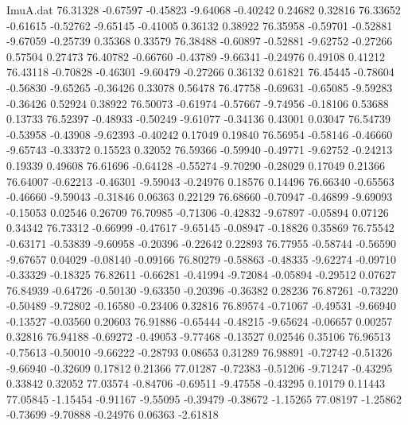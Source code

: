 \begin{filecontents}{ImuA.dat}
  76.31328   -0.67597   -0.45823   -9.64068   -0.40242    0.24682    0.32816
  76.33652   -0.61615   -0.52762   -9.65145   -0.41005    0.36132    0.38922
  76.35958   -0.59701   -0.52881   -9.67059   -0.25739    0.35368    0.33579
  76.38488   -0.60897   -0.52881   -9.62752   -0.27266    0.57504    0.27473
  76.40782   -0.66760   -0.43789   -9.66341   -0.24976    0.49108    0.41212
  76.43118   -0.70828   -0.46301   -9.60479   -0.27266    0.36132    0.61821
  76.45445   -0.78604   -0.56830   -9.65265   -0.36426    0.33078    0.56478
  76.47758   -0.69631   -0.65085   -9.59283   -0.36426    0.52924    0.38922
  76.50073   -0.61974   -0.57667   -9.74956   -0.18106    0.53688    0.13733
  76.52397   -0.48933   -0.50249   -9.61077   -0.34136    0.43001    0.03047
  76.54739   -0.53958   -0.43908   -9.62393   -0.40242    0.17049    0.19840
  76.56954   -0.58146   -0.46660   -9.65743   -0.33372    0.15523    0.32052
  76.59366   -0.59940   -0.49771   -9.62752   -0.24213    0.19339    0.49608
  76.61696   -0.64128   -0.55274   -9.70290   -0.28029    0.17049    0.21366
  76.64007   -0.62213   -0.46301   -9.59043   -0.24976    0.18576    0.14496
  76.66340   -0.65563   -0.46660   -9.59043   -0.31846    0.06363    0.22129
  76.68660   -0.70947   -0.46899   -9.69093   -0.15053    0.02546    0.26709
  76.70985   -0.71306   -0.42832   -9.67897   -0.05894    0.07126    0.34342
  76.73312   -0.66999   -0.47617   -9.65145   -0.08947   -0.18826    0.35869
  76.75542   -0.63171   -0.53839   -9.60958   -0.20396   -0.22642    0.22893
  76.77955   -0.58744   -0.56590   -9.67657    0.04029   -0.08140   -0.09166
  76.80279   -0.58863   -0.48335   -9.62274   -0.09710   -0.33329   -0.18325
  76.82611   -0.66281   -0.41994   -9.72084   -0.05894   -0.29512    0.07627
  76.84939   -0.64726   -0.50130   -9.63350   -0.20396   -0.36382    0.28236
  76.87261   -0.73220   -0.50489   -9.72802   -0.16580   -0.23406    0.32816
  76.89574   -0.71067   -0.49531   -9.66940   -0.13527   -0.03560    0.20603
  76.91886   -0.65444   -0.48215   -9.65624   -0.06657    0.00257    0.32816
  76.94188   -0.69272   -0.49053   -9.77468   -0.13527    0.02546    0.35106
  76.96513   -0.75613   -0.50010   -9.66222   -0.28793    0.08653    0.31289
  76.98891   -0.72742   -0.51326   -9.66940   -0.32609    0.17812    0.21366
  77.01287   -0.72383   -0.51206   -9.71247   -0.43295    0.33842    0.32052
  77.03574   -0.84706   -0.69511   -9.47558   -0.43295    0.10179    0.11443
  77.05845   -1.15454   -0.91167   -9.55095   -0.39479   -0.38672   -1.15265
  77.08197   -1.25862   -0.73699   -9.70888   -0.24976    0.06363   -2.61818

\end{filecontents}
